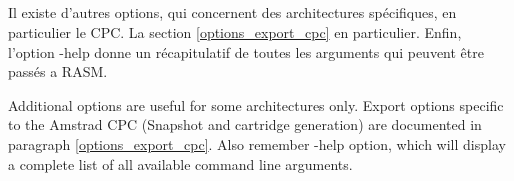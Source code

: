 



\subsection{}

\begin{xfr}
  Il existe d'autres options, qui concernent des architectures spécifiques, en particulier le CPC. La section \ref{options_export_cpc} en particulier.
  Enfin, l'option -help donne un récapitulatif de toutes les arguments qui peuvent être passés a RASM.
\end{xfr}

\begin{xen}
  Additional options are useful for some architectures only. Export options specific to the Amstrad CPC (Snapshot and cartridge generation) are documented in paragraph \ref{options_export_cpc}.
  Also remember -help option, which will display a complete list of all available command line arguments.
\end{xen}

